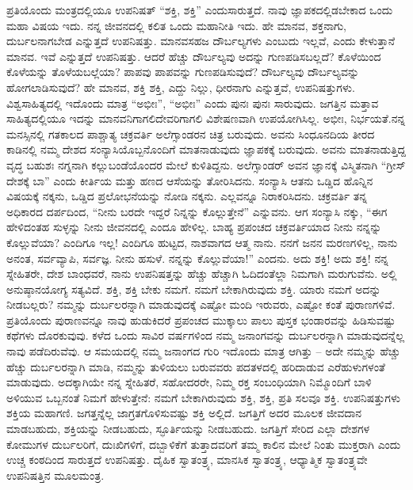 ಪ್ರತಿಯೊಂದು ಮಂತ್ರದಲ್ಲಿಯೂ ಉಪನಿಷತ್​ “ಶಕ್ತಿ, ಶಕ್ತಿ” ಎಂದು\break ಸಾರುತ್ತದೆ. ನಾವು ಜ್ಞಾಪಕದಲ್ಲಿಡಬೇಕಾದ ಒಂದು ಮಹಾ ವಿಷಯ ಇದು. ನನ್ನ ಜೀವನದಲ್ಲಿ ಕಲಿತ ಒಂದು ಮಹಾನೀತಿ ಇದು. ಹೇ ಮಾನವ, ಶಕ್ತನಾಗು, ದುರ್ಬಲನಾಗಬೇಡ ಎನ್ನುತ್ತದೆ ಉಪನಿಷತ್ತು. ಮಾನವಸಹಜ ದೌರ್ಬಲ್ಯಗಳು ಎಂಬುದು ಇಲ್ಲವೆ, ಎಂದು ಕೇಳುತ್ತಾನೆ ಮಾನವ. ಇವೆ ಎನ್ನುತ್ತದೆ ಉಪನಿಷತ್ತು. ಆದರೆ ಹೆಚ್ಚು ದೌರ್ಬಲ್ಯವು ಅದನ್ನು ಗುಣಪಡಿಸಬಲ್ಲದೆ? ಕೊಳೆಯಿಂದ ಕೊಳೆಯನ್ನು ತೊಳೆಯಬಲ್ಲೆಯಾ? ಪಾಪವು ಪಾಪವನ್ನು ಗುಣಪಡಿಸುವುದೆ? ದೌರ್ಬಲ್ಯವು ದೌರ್ಬಲ್ಯವನ್ನು ಹೋಗಲಾಡಿಸುವುದೆ? ಹೇ ಮಾನವ, ಶಕ್ತಿ ಶಕ್ತಿ, ಎದ್ದು ನಿಲ್ಲು, ಧೀರನಾಗು ಎನ್ನುತ್ತವೆ, ಉಪನಿಷತ್ತುಗಳು. ವಿಶ್ವಸಾಹಿತ್ಯದಲ್ಲಿ ಇದೊಂದು ಮಾತ್ರ “ಅಭೀಃ”, “ಅಭೀಃ” ಎಂದು ಪುನಃ ಪುನಃ ಸಾರುವುದು. ಜಗತ್ತಿನ ಮತ್ತಾವ ಸಾಹಿತ್ಯದಲ್ಲಿಯೂ ಇದನ್ನು ಮಾನವನಿಗಾಗಲಿ\break ದೇವರಿಗಾಗಲಿ ವಿಶೇಷಣವಾಗಿ ಉಪಯೋಗಿಸಿಲ್ಲ. ಅಭೀಃ, ನಿರ್ಭಯತೆ.\break ನನ್ನ ಮನಸ್ಸಿನಲ್ಲಿ ಗತಕಾಲದ ಪಾಶ್ಚಾತ್ಯ ಚಕ್ರವರ್ತಿ ಅಲೆಗ್ಸಾಂಡರನ ಚಿತ್ರ ಬರುವುದು. ಅವನು ಸಿಂಧೂನದಿಯ ತೀರದ ಕಾಡಿನಲ್ಲಿ ನಮ್ಮ ದೇಶದ ಸಂನ್ಯಾಸಿಯೊಬ್ಬನೊಂದಿಗೆ ಮಾತನಾಡುವುದು ಜ್ಞಾಪಕಕ್ಕೆ ಬರುವುದು. ಅವನು ಮಾತನಾಡುತ್ತಿದ್ದ ವೃದ್ಧ ಬಹುಶಃ ನಗ್ನನಾಗಿ ಕಲ್ಲುಬಂಡೆಯೊಂದರ ಮೇಲೆ ಕುಳಿತಿದ್ದನು. ಅಲೆಗ್ಸಾಂಡರ್​ ಅವನ ಜ್ಞಾನಕ್ಕೆ ವಿಸ್ಮಿತನಾಗಿ “ಗ್ರೀಸ್​ ದೇಶಕ್ಕೆ ಬಾ” ಎಂದು ಕೀರ್ತಿಯ ಮತ್ತು ಹಣದ ಆಸೆಯನ್ನು ತೋರಿಸಿದನು. ಸಂನ್ಯಾಸಿ ಆತನು ಒಡ್ಡಿದ ಹೊನ್ನಿನ ವಿಷಯಕ್ಕೆ ನಕ್ಕನು, ಒಡ್ಡಿದ ಪ್ರಲೋಭನೆಯನ್ನು ನೋಡಿ ನಕ್ಕನು. ಎಲ್ಲವನ್ನೂ ನಿರಾಕರಿಸಿದನು. ಚಕ್ರವರ್ತಿ ತನ್ನ ಅಧಿಕಾರದ ದರ್ಪದಿಂದ, “ನೀನು ಬರದೇ ಇದ್ದರೆ ನಿನ್ನನ್ನು ಕೊಲ್ಲುತ್ತೇನೆ” ಎನ್ನುವನು. ಆಗ ಸಂನ್ಯಾಸಿ ನಕ್ಕು, “ಈಗ ಹೇಳಿದಂತಹ ಸುಳ್ಳನ್ನು ನೀನು ಜೀವನದಲ್ಲಿ ಎಂದೂ ಹೇಳಿಲ್ಲ. ಬಾಹ್ಯ ಪ್ರಪಂಚದ ಚಕ್ರವರ್ತಿಯಾದ ನೀನು ನನ್ನನ್ನು ಕೊಲ್ಲುವೆಯಾ? ಎಂದಿಗೂ ಇಲ್ಲ! ಎಂದಿಗೂ ಹುಟ್ಟದ, ನಾಶವಾಗದ ಆತ್ಮ ನಾನು. ನನಗೆ ಜನನ ಮರಣಗಳಿಲ್ಲ, ನಾನು ಅನಂತ, ಸರ್ವವ್ಯಾಪಿ, ಸರ್ವಜ್ಞ. ನೀನು ಹಸುಳೆ. ನನ್ನನ್ನು ಕೊಲ್ಲುವೆಯಾ!” ಎಂದನು. ಅದು ಶಕ್ತಿ! ಅದು ಶಕ್ತಿ! ನನ್ನ ಸ್ನೇಹಿತರೇ, ದೇಶ ಬಾಂಧವರೆ, ನಾನು ಉಪನಿಷತ್ತನ್ನು ಹೆಚ್ಚು ಹೆಚ್ಚಾಗಿ ಓದಿದಂತೆಲ್ಲಾ ನಿಮಗಾಗಿ ಮರುಗುವೆನು. ಅಲ್ಲಿ ಅನುಷ್ಠಾನಯೋಗ್ಯ ಸತ್ಯವಿದೆ. ಶಕ್ತಿ, ಶಕ್ತಿ ಬೇಕು ನಮಗೆ. ನಮಗೆ ಬೇಕಾಗಿರುವುದು ಶಕ್ತಿ. ಯಾರು ನಮಗೆ ಅದನ್ನು ನೀಡಬಲ್ಲರು? ನಮ್ಮನ್ನು ದುರ್ಬಲರನ್ನಾಗಿ ಮಾಡುವುದಕ್ಕೆ ಎಷ್ಟೋ ಮಂದಿ ಇರುವರು, ಎಷ್ಟೋ ಕಂತೆ ಪುರಾಣಗಳಿವೆ. ಪ್ರತಿಯೊಂದು ಪುರಾಣವನ್ನೂ ನಾವು ಹುಡುಕಿದರೆ ಪ್ರಪಂಚದ ಮುಕ್ಕಾಲು ಪಾಲು ಪುಸ್ತಕ ಭಂಡಾರವನ್ನು ಹಿಡಿಸುವಷ್ಟು ಕಥೆಗಳು ದೊರಕುವುವು. ಕಳೆದ ಒಂದು ಸಾವಿರ ವರ್ಷಗಳಿಂದ ನಮ್ಮ ಜನಾಂಗವನ್ನು ದುರ್ಬಲರನ್ನಾಗಿ ಮಾಡುವುದನ್ನೆಲ್ಲ ನಾವು ಪಡೆದಿರುವೆವು. ಆ ಸಮಯದಲ್ಲಿ ನಮ್ಮ ಜನಾಂಗದ ಗುರಿ ಇದೊಂದು ಮಾತ್ರ ಆಗಿತ್ತು – ಅದೇ ನಮ್ಮನ್ನು ಹೆಚ್ಚು ಹೆಚ್ಚು ದುರ್ಬಲರನ್ನಾಗಿ ಮಾಡಿ, ನಮ್ಮನ್ನು ತುಳಿಯಲು ಬರುವವರು ಪದತಳದಲ್ಲಿ ಹರಿದಾಡುವ ಎರೆಹುಳುಗಳಂತೆ ಮಾಡುವುದು. ಅದಕ್ಕಾಗಿಯೇ ನನ್ನ ಸ್ನೇಹಿತರೆ, ಸಹೋದರರೇ, ನಿಮ್ಮ ರಕ್ತ ಸಂಬಂಧಿಯಾಗಿ ನಿಮ್ಮೊಂದಿಗೆ ಬಾಳಿ ಅಳಿಯುವ ಒಬ್ಬನಂತೆ ನಿಮಗೆ ಹೇಳುತ್ತೇನೆ: ನಮಗೆ ಬೇಕಾಗಿರುವುದು ಶಕ್ತಿ, ಶಕ್ತಿ, ಪ್ರತಿ ಸಲವೂ ಶಕ್ತಿ. ಉಪನಿಷತ್ತುಗಳು ಶಕ್ತಿಯ ಮಹಾಗಣಿ. ಜಗತ್ತನ್ನೆಲ್ಲ ಜಾಗ್ರತಗೊಳಿಸುವಷ್ಟು ಶಕ್ತಿ ಅಲ್ಲಿದೆ. ಜಗತ್ತಿಗೆ ಅದರ ಮೂಲಕ ಜೀವದಾನ ಮಾಡಬಹುದು, ಶಕ್ತಿಯನ್ನು ನೀಡಬಹುದು, ಸ್ಫೂರ್ತಿಯನ್ನು ನೀಡಬಹುದು. ಜಗತ್ತಿಗೆ ಸೇರಿದ ಎಲ್ಲಾ ದೇಶಗಳ ಕೋಮುಗಳ ದುರ್ಬಲರಿಗೆ, ದುಃಖಿಗಳಿಗೆ, ದಬ್ಬಾಳಿಕೆಗೆ ತುತ್ತಾದವರಿಗೆ ತಮ್ಮ ಕಾಲಿನ ಮೇಲೆ ನಿಂತು ಮುಕ್ತರಾಗಿ ಎಂದು ಉಚ್ಚ ಕಂಠದಿಂದ ಸಾರುತ್ತದೆ ಉಪನಿಷತ್ತು. ದೈಹಿಕ ಸ್ವಾತಂತ್ರ್ಯ, ಮಾನಸಿಕ ಸ್ವಾತಂತ್ರ್ಯ, ಆಧ್ಯಾತ್ಮಿಕ ಸ್ವಾತಂತ್ರ್ಯವೇ ಉಪನಿಷತ್ತಿನ ಮೂಲಮಂತ್ರ.

